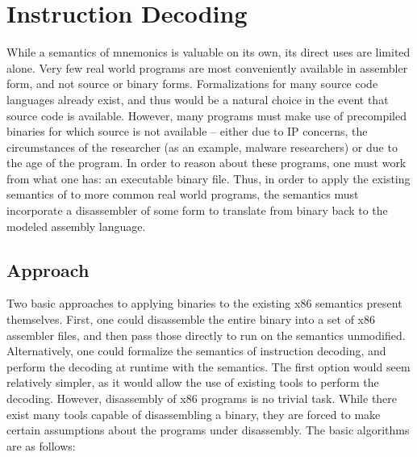\section{Instruction Decoding}

While a semantics of \GENISA mnemonics is valuable on its own, its direct uses are limited alone.  Very few real world programs are most conveniently available in assembler form, and not source or binary forms.   Formalizations for many source code languages already exist, and thus would be a natural choice in the event that source code is available.  However, many programs must make use of precompiled binaries for which source is not available – either due to IP concerns, the circumstances of the researcher (as an example, malware researchers) or due to the age of the program.  In order to reason about these programs, one must work from what one has: an executable binary file.  Thus, in order to apply the existing semantics of \GENISA to more common real world programs, the semantics must incorporate a disassembler of some form to translate from binary back to the modeled assembly language.
\subsection{Approach}
Two basic approaches to applying binaries to the existing x86 semantics present themselves.  First, one could disassemble the entire binary into a set of x86 assembler files, and then pass those directly to run on the semantics unmodified.  Alternatively, one could formalize the semantics of instruction decoding, and perform the decoding at runtime with the semantics.  The first option would seem relatively simpler, as it would allow the use of existing tools to perform the decoding.  However, disassembly of x86 programs is no trivial task.  While there exist many tools capable of disassembling a binary, they are forced to make certain assumptions about the programs under disassembly.  The basic algorithms are as follows:

